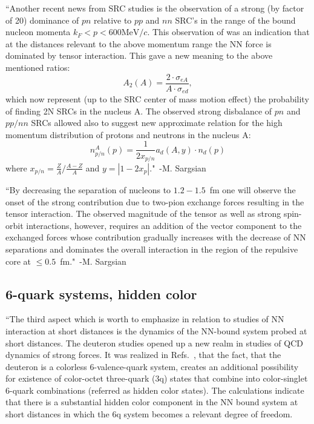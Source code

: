 ``Another recent news from SRC studies is the observation of a strong (by factor of 20) dominance of $pn$ relative to $pp$ and $nn$ SRC's in the range of the bound nucleon momenta $k_F<p<600 \mathrm{MeV}/c$\cite{Piasetzky:2006ai,Subedi:2008zz}. This observation of was an indication that at the distances relevant to the above momentum range the NN force is dominated by tensor interaction. This gave a new meaning to the above mentioned ratios:
\begin{equation}
	A_2(A) = \frac{2\cdot \sigma_{eA}}{A\cdot \sigma_{ed}},
\end{equation}
which now represent (up to the SRC center of mass motion effect) the probability of finding 2N SRCs in the nucleus A. The observed strong disbalance of $pn$ and $pp/nn$ SRCs allowed also to suggest new approximate relation for the high momentum distribution of protons and neutrons in the nucleus A\cite{McGauley:2011qc}:
\begin{equation}
	n^A_{p/n}(p) = \frac{1}{2x_{p/n}}a_d(A,y)\cdot n_d(p)
\end{equation}
where $x_{p/n}=\frac{Z}{A}/\frac{A-Z}{A}$ and $y=\left| 1-2x_p\right|$."~-M. Sargsian~\cite{Sargsian:2012gj}


``By decreasing the separation of nucleons to $1.2-1.5$~fm one will observe the onset of the strong contribution due to two-pion exchange forces resulting in the tensor interaction. The observed magnitude of the tensor as well as strong spin-orbit interactions, however, requires an addition of the vector component to the exchanged forces whose contribution gradually increases with the decrease of NN separations and dominates the overall interaction in the region of the repulsive core at $\leq 0.5$~fm."~-M. Sargsian~\cite{Sargsian:2014bwa}


\subsection{6-quark systems, hidden color}

``The third aspect which is worth to emphasize in relation to studies of NN interaction at short distances is the dynamics of the NN-bound system probed at short distances. The deuteron studies opened up a new realm in studies of QCD dynamics of strong forces. It was realized in Refs.~\cite{Harvey:1980rva, Obukhovsky:1982ci, Brodsky:1985gu, Ji:1985ky,Kusainov:1991vn}, that the fact, that the deuteron is a colorless 6-valence-quark system, creates an additional possibility for existence of color-octet three-quark (3q) states that combine into color-singlet 6-quark combinations (referred as hidden color states). The calculations indicate that there is a substantial hidden color component in the NN bound system at short distances in which the 6q system becomes a relevant degree of freedom.


